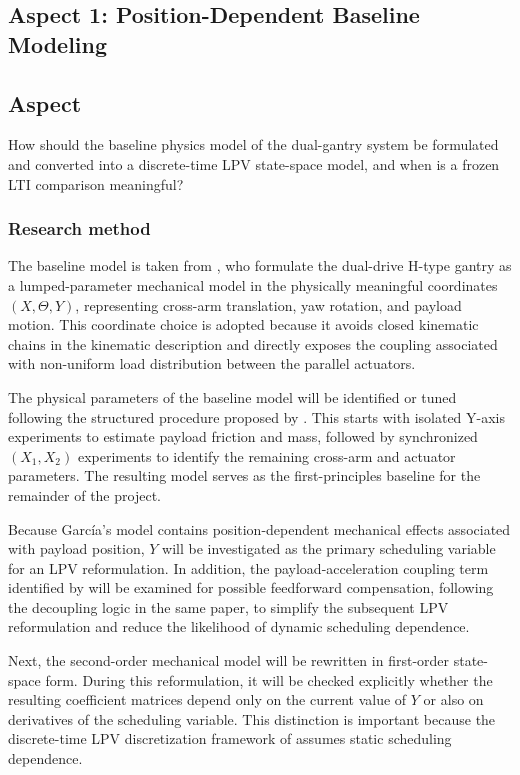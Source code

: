 \subsection{Aspect 1: Position-Dependent Baseline Modeling}

\subsection*{Aspect}
How should the baseline physics model of the dual-gantry system be formulated and converted into a discrete-time LPV state-space model, and when is a frozen LTI comparison meaningful?

\subsubsection{Research method}

The baseline model is taken from \citet{garcia2013model}, who formulate the dual-drive H-type gantry as a lumped-parameter mechanical model in the physically meaningful coordinates $(X,\Theta,Y)$, representing cross-arm translation, yaw rotation, and payload motion. This coordinate choice is adopted because it avoids closed kinematic chains in the kinematic description and directly exposes the coupling associated with non-uniform load distribution between the parallel actuators.

The physical parameters of the baseline model will be identified or tuned following the structured procedure proposed by \citet{garcia2013model}. This starts with isolated Y-axis experiments to estimate payload friction and mass, followed by synchronized $(X_1,X_2)$ experiments to identify the remaining cross-arm and actuator parameters. The resulting model serves as the first-principles baseline for the remainder of the project.

Because García's model contains position-dependent mechanical effects associated with payload position, $Y$ will be investigated as the primary scheduling variable for an LPV reformulation. In addition, the payload-acceleration coupling term identified by \citet{garcia2013model} will be examined for possible feedforward compensation, following the decoupling logic in the same paper, to simplify the subsequent LPV reformulation and reduce the likelihood of dynamic scheduling dependence.

Next, the second-order mechanical model will be rewritten in first-order state-space form. During this reformulation, it will be checked explicitly whether the resulting coefficient matrices depend only on the current value of $Y$ or also on derivatives of the scheduling variable. This distinction is important because the discrete-time LPV discretization framework of \citet{toth2010discretization} assumes static scheduling dependence.

